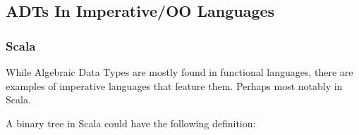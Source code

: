 \documentclass[10pt]{report}
\newcommand{\KIKO}[1]{\textcolor{red}{\textbf{[Kiko: #1]}}}
\begin{document}


\subsection{ADTs In Imperative/OO Languages}
\subsubsection{Scala}


\par{While Algebraic Data Types are mostly found in functional languages, there are examples of imperative languages that feature them. Perhaps most notably in Scala.}
\par{A binary tree in Scala could have the following definition:}
\end{document}
